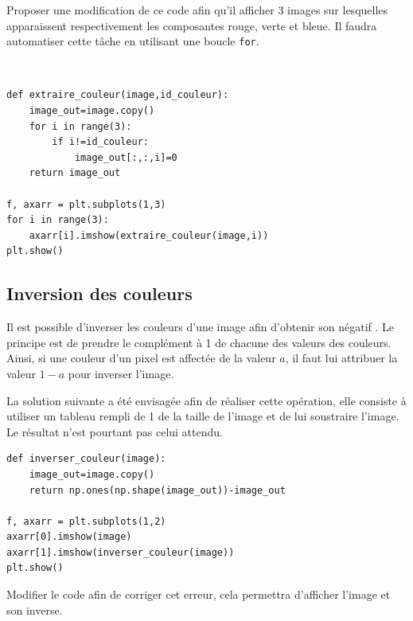 \begin{exercice}
Proposer une modification de ce code afin qu'il afficher 3 images sur lesquelles apparaissent respectivement les composantes rouge, verte et bleue. Il faudra automatiser cette tâche en utilisant une boucle \verb?for?.
\end{exercice}

\begin{solution}~\\
\vspace{-0.7cm}
\begin{verbatim}
def extraire_couleur(image,id_couleur):
    image_out=image.copy()
    for i in range(3):
        if i!=id_couleur:
            image_out[:,:,i]=0
    return image_out

f, axarr = plt.subplots(1,3)
for i in range(3):
    axarr[i].imshow(extraire_couleur(image,i))
plt.show()
\end{verbatim} 
\end{solution}

\subsection{Inversion des couleurs}

Il est possible d'inverser les couleurs d'une image afin d'obtenir son \og négatif \fg. Le principe est de prendre le complément à 1 de chacune des valeurs des couleurs. Ainsi, si une couleur d'un pixel est affectée de la valeur $a$, il faut lui attribuer la valeur $1-a$ pour inverser l'image.

La solution suivante a été envisagée afin de réaliser cette opération, elle consiste à utiliser un tableau rempli de 1 de la taille de l'image et de lui soustraire l'image. Le résultat n'est pourtant pas celui attendu.


\begin{verbatim}
def inverser_couleur(image):
    image_out=image.copy()
    return np.ones(np.shape(image_out))-image_out

f, axarr = plt.subplots(1,2)
axarr[0].imshow(image)
axarr[1].imshow(inverser_couleur(image))
plt.show()
\end{verbatim} 

\begin{exercice}
Modifier le code afin de corriger cet erreur, cela permettra d'afficher l'image et son inverse.
\end{exercice}

